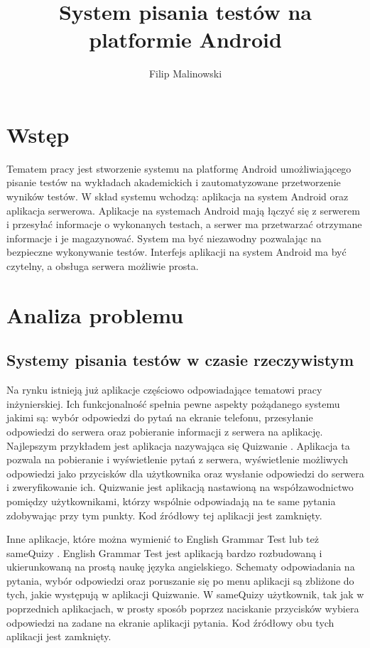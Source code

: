 \documentclass[eng]{mgr}
\title{System pisania testów na platformie Android}
\author{Filip Malinowski}
\begin{document}
\maketitle

\tableofcontents

	\chapter*{Wstęp}
	
	Tematem pracy jest stworzenie systemu na platformę Android umożliwiającego pisanie testów na wykładach akademickich i zautomatyzowane przetworzenie wyników testów. W skład systemu wchodzą: aplikacja na system Android oraz aplikacja serwerowa. Aplikacje na systemach Android mają łączyć się z serwerem i przesyłać informacje o wykonanych testach, a serwer ma przetwarzać otrzymane informacje i je magazynować. System ma być niezawodny pozwalając na bezpieczne wykonywanie testów. Interfejs aplikacji na system Android ma być czytelny, a obsługa serwera możliwie prosta.

	
	\chapter{Analiza problemu}
	
		\section{Systemy pisania testów w czasie rzeczywistym}
		Na rynku istnieją już aplikacje częściowo odpowiadające tematowi pracy inżynierskiej. Ich funkcjonalność spełnia pewne aspekty pożądanego systemu jakimi są: wybór odpowiedzi do pytań na ekranie telefonu, przesyłanie odpowiedzi do serwera oraz pobieranie informacji z serwera na aplikację. Najlepszym przykładem jest aplikacja nazywająca się Quizwanie \cite{quizwanie}. Aplikacja ta pozwala na pobieranie i wyświetlenie pytań z serwera, wyświetlenie możliwych odpowiedzi jako przycisków dla użytkownika oraz wysłanie odpowiedzi do serwera i zweryfikowanie ich. Quizwanie jest aplikacją nastawioną na współzawodnictwo pomiędzy użytkownikami, którzy wspólnie odpowiadają na te same pytania zdobywając przy tym punkty. Kod źródłowy tej aplikacji jest zamknięty.
	
		Inne aplikacje, które można wymienić to English Grammar Test \cite{englishgrammar} lub też sameQuizy \cite{samequizy}. English Grammar Test jest aplikacją bardzo rozbudowaną i ukierunkowaną na prostą naukę języka angielskiego. Schematy odpowiadania na pytania, wybór odpowiedzi oraz poruszanie się po menu aplikacji są zbliżone do tych, jakie występują w aplikacji Quizwanie. W sameQuizy użytkownik, tak jak w poprzednich aplikacjach, w prosty sposób poprzez naciskanie przycisków wybiera odpowiedzi na zadane na ekranie aplikacji pytania. Kod źródłowy obu tych aplikacji jest zamknięty.
		
\end{document}
